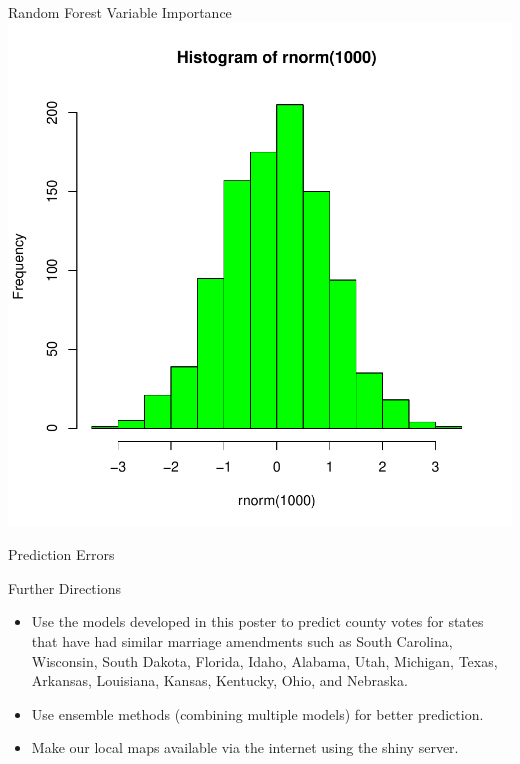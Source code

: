 \documentclass[final]{beamer}
\begin{document}
\begin{frame}[fragile]
\begin{columns}[t]
\begin{column}{0.31\linewidth}
\begin{minipage}[t][.955\textheight]{\linewidth}
\vspace{0ex}
\begin{block}{Random Forest Variable Importance}
\vspace{0ex}
\includegraphics{SummerBridge1-005}
\vspace{0ex}
\vfill
\end{block}
\vfill

\begin{block}{Prediction Errors}
\vspace{0ex}
\vfill
\end{block}
\vfill

\begin{block}{Further Directions}
\begin{itemize}
\item Use the models developed in this poster to predict county votes for states that have had similar marriage amendments such as South Carolina, Wisconsin, South Dakota, Florida, Idaho, Alabama, Utah, Michigan, Texas, Arkansas, Louisiana, Kansas, Kentucky, Ohio, and Nebraska. 
\item  Use ensemble methods (combining multiple models) for better prediction.
\item  Make our local maps available via the internet using the shiny server.
\end{itemize}
\vspace{0ex}
\vfill
\end{block}
\vfill


\end{minipage}
\end{column}
\end{columns}
\end{frame}
\end{document}
